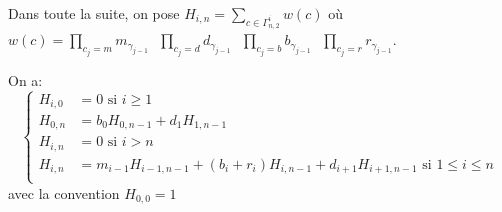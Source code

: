Dans toute la suite, on pose $H_{i,n} = \underset{c\in \Gamma_{n,2}^{i}}{\sum}w(c)$ où $w(c) = \underset{c_{j}=m}{\prod}
	m_{\gamma_{j-1}}\text{ } \underset{c_{j}=d}{\prod}d_{\gamma_{j-1}}\text{ }\underset{c_{j}=b}{\prod}
	b_{\gamma_{j-1}}\text{ }\underset{c_{j}=r}{\prod}r_{\gamma_{j-1}}$.\\
\begin{proposition} \label{weight-tab}
	On a:
	\[
		\begin{cases}
			H_{i,0} & =0 \text{ si }i\geq 1                                                                  \\
			H_{0,n} & =b_{0}H_{0,n-1}+d_{1}H_{1,n-1}                                                         \\
			H_{i,n} & =0 \text{ si } i>n                                                                     \\
			H_{i,n} & =m_{i-1}H_{i-1,n-1}+(b_{i}+r_{i})H_{i,n-1}+d_{i+1}H_{i+1,n-1} \text{ si }1\leq i\leq n \\
		\end{cases}
	\]
	avec la convention $H_{0,0}=1$
\end{proposition}

